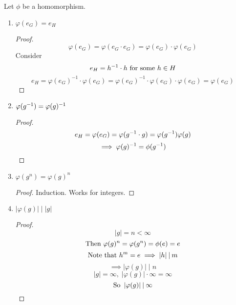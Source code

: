\documentclass[12pt]{article}
\newcommand{\order}[1]{\left\lvert#1\right\rvert}
\newcommand{\divides}{\mathbin|}
\begin{document}
\bboxlem
\begin{lem}\label{lem:properties_of_homs}
    Let \(\phi\) be a homomorphism.
    \begin{enumerate}
        \item \(\varphi(e_G)=e_H\)
            \bboxproof
            \begin{proof}
                \[
                    \varphi(e_G)=\varphi(e_G\cdot e_G)
                    =\varphi(e_G)\cdot\varphi(e_G)
                \]
                Consider
                \[
                    e_H=h^{-1}\cdot h\text{ for some }h\in H
                \]
                \[
                    e_H=\varphi(e_G)^{-1}\cdot\varphi(e_G)
                    =\varphi(e_G)^{-1}\cdot\varphi(e_G)\cdot\varphi(e_G)
                    =\varphi(e_G)
                \]
            \end{proof}
            \ebox
        \item \(\varphi(g^{-1})=\varphi(g)^{-1}\)
            \bboxproof
            \begin{proof}
                \[
                    e_H=\varphi(e_G)=\varphi(g^{-1}\cdot g)=\varphi(g^{-1})\varphi(g)
                \]
                \[
                    \implies\varphi(g)^{-1}=\phi(g^{-1})
                \]
            \end{proof}
            \ebox
        \item \(\varphi(g^n)=\varphi(g)^n\)
            \bboxproof
            \begin{proof}
                Induction. Works for integers.
            \end{proof}
            \ebox
        \item \(\order{\varphi(g)}\divides\order{g}\)
            \bboxproof
            \begin{proof}
                \[
                    \order g=n<\infty
                \]
                \[
                    \text{Then }\varphi(g)^n=\varphi(g^n)=\phi(e)=e
                \]
                \[
                    \T{Note that }h^m=e\implies \order{h}\divides m
                \]
                \[
                    \implies\order{\varphi(g)}\divides n
                \]
                \[
                    \order{g}=\infty,\;\order{\varphi(g)}\cdot\infty=\infty
                \]
                \[
                    \T{So }\order{\varphi(g)}\divides\infty
                \]
            \end{proof}
            \ebox

    \end{enumerate}
\end{lem}
\ebox
\end{document}
